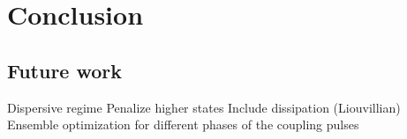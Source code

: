 \documentclass[main.tex]{subfiles}
\begin{document}
\chapter{Conclusion}


\section{Future work}
Dispersive regime
Penalize higher states
Include dissipation (Liouvillian)
Ensemble optimization for different phases of the coupling pulses
\end{document}
